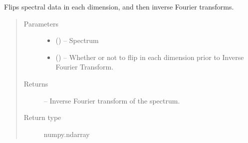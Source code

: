 \documentclass[letterpaper,10pt,english]{sphinxmanual}
\begin{document}
\begin{fulllineitems}
\label{\detokenize{references/sig:nmrespy.sig.ift}}
\sphinxAtStartPar
Flips spectral data in each dimension, and then inverse Fourier
transforms.
\begin{quote}\begin{description}
\item[{Parameters}] \leavevmode\begin{itemize}
\item {} 
\sphinxAtStartPar
{} () – Spectrum

\item {} 
\sphinxAtStartPar
{} (\sphinxstyleliteralemphasis{\sphinxupquote{, }}) – Whether or not to flip  in each dimension prior to Inverse
Fourier Transform.

\end{itemize}

\item[{Returns}] \leavevmode
\sphinxAtStartPar
{} – Inverse Fourier transform of the spectrum.

\item[{Return type}] \leavevmode
\sphinxAtStartPar
numpy.ndarray

\end{description}\end{quote}

\end{fulllineitems}

\end{document}
